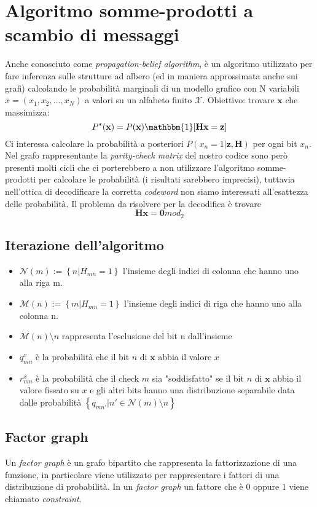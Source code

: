 \documentclass{article}
\begin{document}
	\section{Algoritmo somme-prodotti a scambio di messaggi}
Anche conosciuto come \textit{propagation-belief algorithm}, è un algoritmo utilizzato per fare inferenza sulle strutture ad albero (ed in maniera approssimata anche sui grafi) calcolando le probabilità marginali di un modello grafico con N variabili $\bar{x} = (x_1,x_2, ..., x_N)$ a valori su un alfabeto finito $\mathcal{X}$.
Obiettivo: trovare $\textbf{x}$ che massimizza:
\begin{equation} 
	P^*(\textbf{x})=P(\textbf{x})\mathbbm{1}[\textbf{Hx} = \textbf{z}]
\end{equation}
Ci interessa calcolare la probabilità a posteriori $P(x_n = 1 | \textbf{z}, \textbf{H})$ per ogni bit $x_n$. Nel grafo rappresentante la \textit{parity-check matrix} del nostro codice sono però presenti molti cicli che ci porterebbero a non utilizzare l'algoritmo somme-prodotti per calcolare le probabilità (i risultati sarebbero imprecisi), tuttavia nell'ottica di decodificare la corretta \textit{codeword} non siamo interessati all'esattezza delle probabilità. Il problema da risolvere per la decodifica è trovare 
\begin{equation}
\textbf{Hx} = \textbf{0}  mod_2
\end{equation}
	\subsection{Iterazione dell'algoritmo}
	\begin{itemize}
		\item $\mathcal{N}(m) := \left\{ n | H_{mn} = 1 \right\}$ l'insieme degli indici di colonna che hanno uno alla riga m.
		\item $\mathcal{M}(n) := \left\{ m | H_{mn} = 1 \right\}$ l'insieme degli indici di riga che hanno uno alla colonna n.
		\item $\mathcal{M}(n)\setminus n$ rappresenta l'esclusione del bit n dall'insieme
		\item $q^x_{mn}$ è la probabilità che il bit $n$ di $\textbf{x}$ abbia il valore $x$
		\item $r^x_{mn}$ è la probabilità che il check $m$ sia "soddisfatto" se il bit $n$ di $\textbf{x}$ abbia il valore fissato su $x$ e gli altri bits hanno una distribuzione separabile data dalle probabilità $\left\{ q_{mn'} | n' \in \mathcal{N}(m)\setminus n\right\}$
	\end{itemize}
	\subsection{Factor graph}
	Un \textit{factor graph} è un grafo bipartito che rappresenta la fattorizzazione di una funzione, in particolare viene utilizzato per rappresentare i fattori di una distribuzione di probabilità. In un \textit{factor graph} un fattore che è $0$ oppure $1$ viene chiamato \textit{constraint}.
\end{document}
